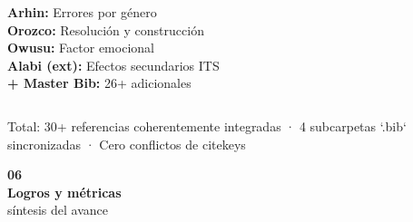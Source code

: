 \documentclass[11pt, aspectratio=169, spanish]{beamer}
\begin{document}
\begin{frame}[plain, shrink=20]
\begin{columns}[T]
\begin{tcolorbox}[colback=VerdeUNAL!7, colframe=VerdeUNAL!50, arc=2mm,
  title={\centering\scriptsize\textbf{1.2.3 Dificultades}}]
{\tiny
\textbf{Arhin:} Errores por género\\
\textbf{Orozco:} Resolución y construcción\\
\textbf{Owusu:} Factor emocional\\
\textbf{Alabi (ext):} Efectos secundarios ITS\\
\textbf{+ Master Bib:} 26+ adicionales
}
\end{tcolorbox}

\end{columns}

\vspace{0.12cm}

\begin{tcolorbox}[colback=GrisFondo, colframe=GrisClaro, arc=2mm, boxrule=0.8pt]
{\scriptsize
Total: 30+ referencias coherentemente integradas · 4 subcarpetas `.bib` sincronizadas · Cero conflictos de citekeys
}
\end{tcolorbox}

\end{frame}

\begin{frame}[plain]
\vspace*{1.0cm}
\begin{center}
{\fontsize{40}{48}\selectfont\textcolor{VerdeUNAL!40}{\textbf{06}}}\\[-0.1cm]
{\Large\textbf{Logros y métricas}}\\[0.05cm]
{\normalsize\textcolor{GrisClaro!80!black}{síntesis del avance}}
\end{center}
\end{frame}
\end{document}
